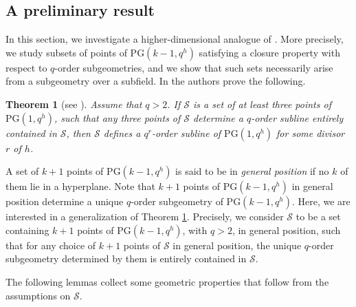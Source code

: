 \documentclass[11pt]{article}
\newtheorem{theorem}{Theorem}[section]
\theoremstyle{definition}
\numberwithin{equation}{section}
\def\cS{\mathcal S}
\def\PG{\mathrm{PG}}
\begin{document}
\subsection{A preliminary result}



In this section, we investigate a higher-dimensional analogue of \cite[Theorem 1.5]{Rottey}. More precisely, we study subsets of points of 
$\PG(k-1,q^h)$ satisfying a closure property with respect to 
$q$-order subgeometries, and we show that such sets necessarily arise from 
a subgeometry over a subfield. In \cite{Rottey} the authors prove the following.

\begin{theorem}[see {\cite[Theorem 1.5]{Rottey}}] \label{rottey}
Assume that $q>2$. If $\cS$ is a set of at least three points of $\PG(1,q^h)$, such that any three points of $\cS$ determine a $q$-order subline entirely contained in $\cS$, then $\cS$ defines a $q^r$-order subline of $\PG(1, q^h)$ for
some divisor $r$ of $h$.    
\end{theorem}

A set of $k+1$ points of $\PG(k-1,q^h)$ is said to be in {\em general position} if no $k$ of them lie in a hyperplane. Note that $k+1$ points of $\PG(k-1, q^h)$ in general position determine a unique $q$-order subgeometry of $\PG(k-1, q^h)$. Here, we are interested in a generalization of Theorem \ref{rottey}. Precisely, we consider $\cS$ to be a set containing $k+1$ points of  
$\PG(k-1,q^h)$, with $q>2$, in general position, such that for any choice 
of $k+1$ points of $\mathcal S$ in general position, the unique $q$-order 
subgeometry determined by them is entirely contained in $\cS$.


The following lemmas collect some geometric properties that follow from
the assumptions on $\mathcal S$.
\end{document}

